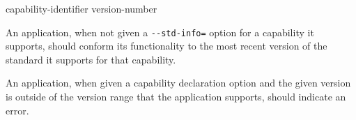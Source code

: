 \begin{ncbnf}

\br
	capability-identifier   version-number

\end{ncbnf}

\pnum
An application, when not given a \verb|--std-info=|
option for a capability it supports, should conform its functionality to the
most recent version of the standard it supports for that capability.

\pnum
An application, when given a capability declaration option and the given
version is outside of the version range that the application supports, should
indicate an error.
